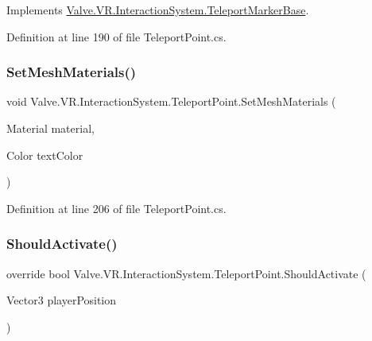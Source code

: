 Implements \mbox{\hyperlink{class_valve_1_1_v_r_1_1_interaction_system_1_1_teleport_marker_base_a0f8f7a7f338cea092cbe1e9e1c12d4f2}{Valve.\+V\+R.\+Interaction\+System.\+Teleport\+Marker\+Base}}.



Definition at line 190 of file Teleport\+Point.\+cs.

\mbox{\label{class_valve_1_1_v_r_1_1_interaction_system_1_1_teleport_point_aea7e2c7f46242c8ce67249b94309915a}} 
\subsubsection{\texorpdfstring{SetMeshMaterials()}{SetMeshMaterials()}}
{\footnotesize\ttfamily void Valve.\+V\+R.\+Interaction\+System.\+Teleport\+Point.\+Set\+Mesh\+Materials (\begin{DoxyParamCaption}\item[{Material}]{material,  }\item[{Color}]{text\+Color }\end{DoxyParamCaption})}



Definition at line 206 of file Teleport\+Point.\+cs.

\mbox{\label{class_valve_1_1_v_r_1_1_interaction_system_1_1_teleport_point_a3a5e0dae80f7d66fbffce006b3c0ab72}} 
\subsubsection{\texorpdfstring{ShouldActivate()}{ShouldActivate()}}
{\footnotesize\ttfamily override bool Valve.\+V\+R.\+Interaction\+System.\+Teleport\+Point.\+Should\+Activate (\begin{DoxyParamCaption}\item[{Vector3}]{player\+Position }\end{DoxyParamCaption})\hspace{0.3cm}{\ttfamily [virtual]}}



